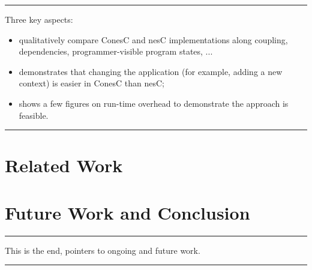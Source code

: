 \documentclass[10pt, conference, compsocconf]{IEEEtran}
\begin{document}
\hrule
\noindent Three key aspects:
\begin{itemize}
\item qualitatively compare ConesC and nesC implementations along
  coupling, dependencies, programmer-visible program states, ...
\item demonstrates that changing the application (for example, adding
  a new context) is easier in ConesC than nesC;
\item shows a few figures on run-time overhead to demonstrate the
  approach is feasible.
\end{itemize}
\hrule

\section{Related Work}
\label{sec:related}


\section{Future Work and Conclusion}
\label{sec:ending}

\hrule
This is the end, pointers to ongoing and future work.
\hrule


\IEEEpeerreviewmaketitle

\end{document}
